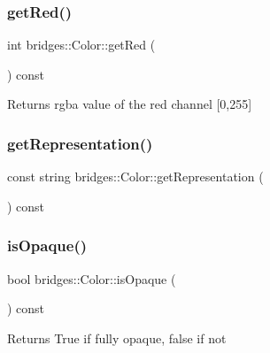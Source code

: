 \subsubsection{\texorpdfstring{getRed()}{getRed()}}
{\footnotesize\ttfamily int bridges\+::\+Color\+::get\+Red (\begin{DoxyParamCaption}{ }\end{DoxyParamCaption}) const\hspace{0.3cm}{\ttfamily [inline]}}

\begin{DoxyReturn}{Returns}
rgba value of the red channel \mbox{[}0,255\mbox{]} 
\end{DoxyReturn}
\mbox{\label{classbridges_1_1_color_a7febf2d083d306060a5017d06abd6ec0}} 
\subsubsection{\texorpdfstring{getRepresentation()}{getRepresentation()}}
{\footnotesize\ttfamily const string bridges\+::\+Color\+::get\+Representation (\begin{DoxyParamCaption}{ }\end{DoxyParamCaption}) const\hspace{0.3cm}{\ttfamily [inline]}}

\mbox{\label{classbridges_1_1_color_ae55f3077cb3bd93386dc11eaeecf823c}} 
\subsubsection{\texorpdfstring{isOpaque()}{isOpaque()}}
{\footnotesize\ttfamily bool bridges\+::\+Color\+::is\+Opaque (\begin{DoxyParamCaption}{ }\end{DoxyParamCaption}) const\hspace{0.3cm}{\ttfamily [inline]}}

\begin{DoxyReturn}{Returns}
True if fully opaque, false if not 
\end{DoxyReturn}
\mbox{\label{classbridges_1_1_color_a56b0d17239aafa0cea7f43e5358cf4c0}} 
